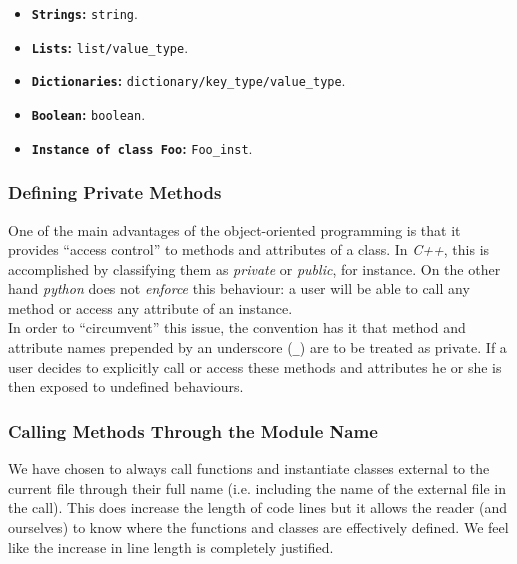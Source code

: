                 \begin{itemize}
                    \item \textbf{\texttt{Strings}:} \texttt{string}.
                    \item \textbf{\texttt{Lists}:} \texttt{list/value\_type}.
                    \item \textbf{\texttt{Dictionaries}:} \texttt{dictionary/key\_type/value\_type}.
                    \item \textbf{\texttt{Boolean}:} \texttt{boolean}.
                    \item \textbf{\texttt{Instance of class Foo}:} \texttt{Foo\_inst}.
                \end{itemize}

            \subsubsection{Defining Private Methods}
                One of the main advantages of the object-oriented programming is that it provides ``access control'' to methods and attributes of a class. In \textit{C++}, this is accomplished by classifying them as \textit{private} or \textit{public}, for instance. On the other hand \textit{python} does not \textit{enforce} this behaviour: a user will be able to call any method or access any attribute of an instance.\\

                In order to ``circumvent'' this issue, the convention has it that method and attribute names prepended by an underscore (\texttt{\_}) are to be treated as private. If a user decides to explicitly call or access these methods and attributes he or she is then exposed to undefined behaviours.\\

            \subsubsection{Calling Methods Through the Module Name}
                We have chosen to always call functions and instantiate classes external to the current file through their full name (i.e. including the name of the external file in the call). This does increase the length of code lines but it allows the reader (and ourselves) to know where the functions and classes are effectively defined. We feel like the increase in line length is completely justified.\\

